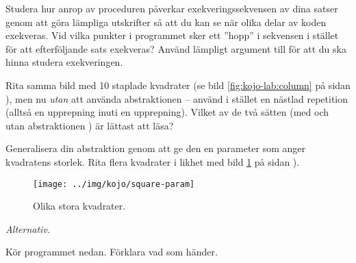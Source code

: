 \Subtask %
Studera hur anrop av proceduren  påverkar exekveringssekvensen av dina satser genom att göra lämpliga utskrifter så att du kan se när olika delar av koden exekveras. Vid vilka punkter i programmet sker ett ''hopp'' i sekvensen i stället för att efterföljande sats exekveras?  Använd lämpligt argument till  för att du ska hinna studera exekveringen.


\Subtask Rita samma bild med 10 staplade kvadrater (se bild \ref{fig:kojo-lab:column} på sidan \pageref{fig:kojo-lab:column}), men nu \emph{utan} att använda abstraktionen  -- använd i stället en nästlad repetition (alltså en upprepning inuti en upprepning). Vilket av de två sätten (med och utan abstraktionen ) är lättast att läsa? %

\Subtask Generalisera din abstraktion  genom att ge den en parameter  som anger kvadratens storlek. Rita flera kvadrater i likhet med bild \ref{fig:kojo-lab:resize} på sidan \pageref{fig:kojo-lab:resize}).

\begin{figure}[H]
\texttt{[image: ../img/kojo/square-param]}
  \caption{Olika stora kvadrater.\label{fig:kojo-lab:resize}}

\end{figure}













\Task \emph{Alternativ.} \label{kojo:alt}

\Subtask Kör programmet nedan. Förklara vad som händer. %

